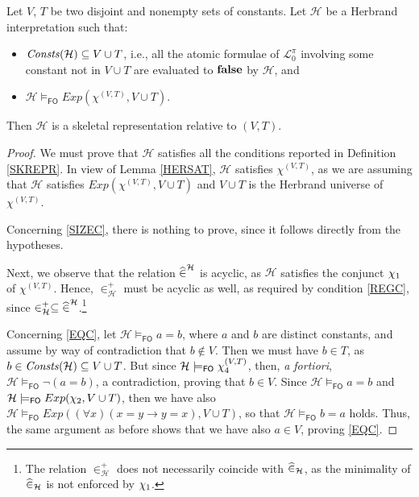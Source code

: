 \documentclass[a4paper]{llncs}
\newcommand{\Elpizero}{\ensuremath{\mathcal{L}_{0}^{\pi}}\xspace}
\newcommand{\HExp}{Exp}
\newcommand{\memclosure}[1]{\in_{#1}^{+}}
\newcommand{\seteq}[2]{#1=#2}
\newcommand{\consta}{a}
\newcommand{\constb}{b}
\newcommand{\hinter}{\ensuremath{\mathcal{H}}}
\newcommand{\fomodels}[2]{#1 \models_{\mathsf{FO}} #2}
\begin{document}
\begin{lemma}\label{HERTOSK}
Let $V$, $T$ be two disjoint and nonempty sets of constants.
Let $\hinter$ be a Herbrand interpretation such that:
\begin{itemize}
  \item $\Consts(\hinter)\subseteq V \cup T$, i.e.,
  all the atomic formulae of $\Elpizero$ involving some constant not in
  $V \cup T$ are evaluated to $\mathbf{false}$ by $\hinter$, and
  \item $\fomodels{\hinter}{\HExp(\chi^{(V,T)}, V \cup T)}$.
\end{itemize}
Then $\hinter$ is a skeletal representation relative to $(V,T)$.
\end{lemma}
\begin{proof}
We must prove that $\hinter$ satisfies all the conditions
reported in Definition \ref{SKREPR}.
In view of Lemma
\ref{HERSAT},
$\hinter$ satisfies $\chi^{(V,T)}$, as we are assuming that
$\hinter$ satisfies $\HExp(\chi^{(V,T)}, V \cup T)$ and $V \cup T$ is
the Herbrand universe of $\chi^{(V,T)}$.

Concerning \ref{SIZEC}, there is nothing to prove, since it follows 
directly from the hypotheses.

Next, we observe that the relation $\memhatP^{\hinter}$ is acyclic,
as $\hinter$ satisfies the conjunct $\chi_1$ of $\chi^{(V,T)}$.
Hence, $\memclosure{\hinter}$ must be acyclic as well, as required by
condition \ref{REGC}, since $\memclosure{\hinter} \subseteq
\memhatP^{\hinter}$.\footnote{The relation $\memclosure{\hinter}$ does
not necessarily coincide with $\memhatP_{\hinter}$, as the minimality
of $\memhatP_{\hinter}$ is not enforced by $\chi_1$.}

Concerning \ref{EQC}, let 
$\fomodels{\hinter}{\seteq{\consta}{\constb}}$, where $a$ and $b$ are 
distinct constants, and assume by
way of contradiction that $\constb \notin V$. Then we must have 
$\constb \in T$, as $b \in \Consts(\hinter) \subseteq V \cup T$.
But since $\fomodels{\hinter}{\eqf}$, then, \emph{a fortiori}, 
$\fomodels{\hinter}{\neg(\seteq{\consta}{\constb})}$, a contradiction,
proving that $\constb \in V$. Since 
$\fomodels{\hinter}{\seteq{\consta}{\constb}}$ and 
$\fomodels{\hinter}{\HExp(\exonef, V \cup T)}$,
then we have also $\fomodels{\hinter}{\HExp((\forall x)(\seteq{x}{y} 
\rightarrow \seteq{y}{x}), V \cup T)}$, so
that $\fomodels{\hinter}{\seteq{\constb}{\consta}}$ holds. Thus, the 
same argument as before shows that we have also
$\consta \in V$, proving \ref{EQC}.


\end{proof}
\end{document}
